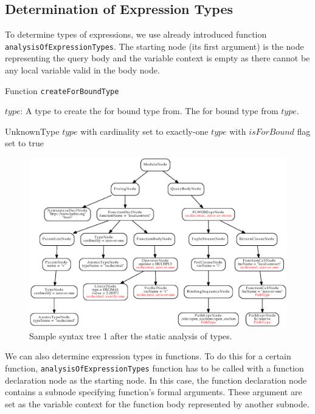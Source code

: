 \subsection{Determination of Expression Types}
To determine types of expressions, we use already introduced function \\ \texttt{analysisOfExpressionTypes}. The starting node (its first argument) is the node representing the query body and the variable context is empty as there cannot be any local variable valid in the body node.

\begin{algorithm}
\caption{Function \texttt{createForBoundType}}
\label{ALG_function_create_for_bound_type}
\begin{algorithmic}[1]
\REQUIRE $type$: A type to create the for bound type from.
\ENSURE The for bound type from $type$.

	\RETURN UnknownType
	\RETURN $type$ with cardinality set to exactly-one
\ELSE
	\STATE {}
	\RETURN $type$ with $isForBound$ flag set to true
\ENDIF
\end{algorithmic}
\end{algorithm}

\begin{figure}
\label{FIG_syntax_tree_1_types}
\caption{Sample syntax tree 1 after the static analysis of types.}
\includegraphics[scale=0.5]{syntax_tree_1_types.eps}
\end{figure}

We can also determine expression types in functions. To do this for a certain function, \texttt{analysisOfExpressionTypes} function has to be called with a function declaration node as the starting node. In this case, the function declaration node contains a subnode specifying function's formal arguments. These argument are set as the variable context for the function body represented by another subnode.

